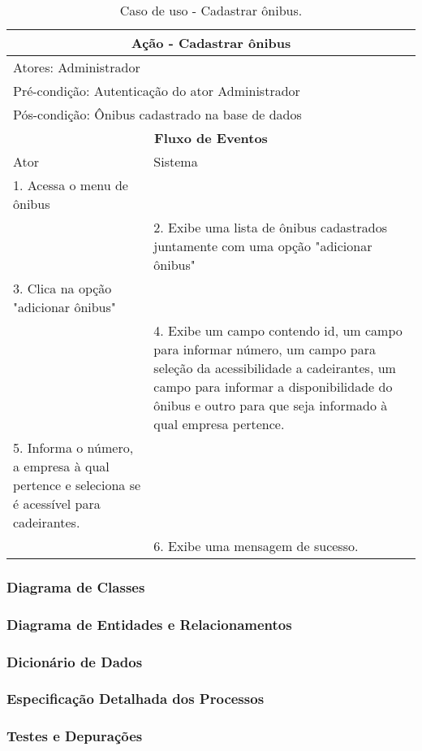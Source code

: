 \documentclass[openright]{ifrs} %
\begin{document}
\begin{table}
\caption{Caso de uso - Cadastrar ônibus.}
\begin{tabular}{p{7cm}|p{7cm}}
\hline
\multicolumn{2}{c}{\bf Ação - Cadastrar ônibus} \\
\hline
\multicolumn{2}{l}{Atores:  Administrador} \\
\hline
\multicolumn{2}{l}{Pré-condição:  Autenticação do ator Administrador} \\
\hline
\multicolumn{2}{l}{Pós-condição:  Ônibus cadastrado na base de dados} \\
\hline
\multicolumn{2}{c}{\bf Fluxo de Eventos} \\
\hline
Ator & Sistema \\
\hline
1. Acessa o menu de ônibus & \\
\hline
 &  2. Exibe uma lista de ônibus cadastrados juntamente com uma opção
"adicionar ônibus" \\
\hline
3. Clica na opção "adicionar ônibus" &\\
\hline
& 4. Exibe um campo contendo id, um campo para informar número, um campo para 
seleção da acessibilidade a cadeirantes, um campo para informar a disponibilidade do 
ônibus e outro para que seja informado à qual empresa pertence.\\
\hline
5. Informa o número, a empresa à qual pertence e seleciona se é 
acessível para cadeirantes. & \\
\hline
& 6. Exibe uma mensagem de sucesso. \\
\hline
\end{tabular}
\label{tabelaCadastrarOnibus}
\end{table}

\subsubsection{Diagrama de Classes}
\subsubsection{Diagrama de Entidades e Relacionamentos}
\subsubsection{Dicionário de Dados}
\subsubsection{Especificação Detalhada dos Processos}
\subsubsection{Testes e Depurações}
\end{document}

